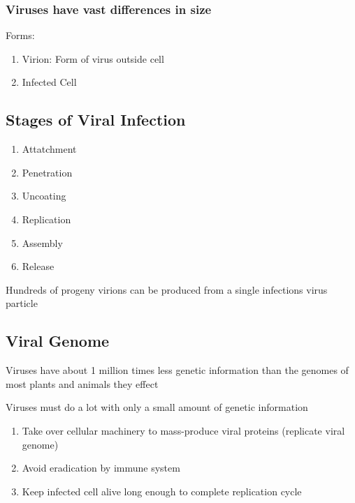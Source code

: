 \documentclass{notes}
\begin{document}
\subsubsection{Viruses have vast differences in size}

Forms:
\begin{enumerate}
    \item Virion: Form of virus outside cell
    \item Infected Cell
\end{enumerate}


\newpage

\subsection{Stages of Viral Infection}

\begin{enumerate}
    \item Attatchment
    \item Penetration
    \item Uncoating
    \item Replication
    \item Assembly
    \item Release
\end{enumerate}


Hundreds of progeny virions can be produced from a single infections virus particle

\subsection{Viral Genome}

Viruses have about 1 million times less genetic information than the genomes of most plants and animals they effect

Viruses must do a lot with only a small amount of genetic information

\begin{enumerate}
    \item Take over cellular machinery to mass-produce viral proteins (replicate viral genome)
    \item Avoid eradication by immune system
    \item Keep infected cell alive long enough to complete replication cycle
\end{enumerate}
\end{document}
